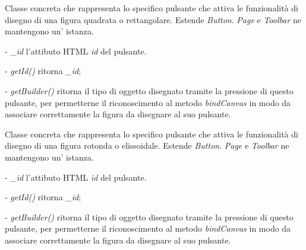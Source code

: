 Classe concreta che rappresenta lo specifico pulsante che attiva le funzionalit\` a di disegno di una figura quadrata o rettangolare.
Estende \textit{Button}.
\textit{Page} e \textit{Toolbar} ne mantengono un' istanza.
\begin{elencopuntato}[\subsubsecindent]
\item[-] \textit{{\_}id} l'attibuto HTML \textit{id} del pulsante.
\end{elencopuntato}
\begin{elencopuntato}[\subsubsecindent]
\item[-] \textit{getId()} ritorna \textit{{\_}id};
\item[-] \textit{getBuilder()} ritorna il tipo di oggetto disegnato tramite la pressione di questo pulsante, per permetterne il riconoscimento al metodo \textit{bindCanvas} in modo da associare correttamente la figura da disegnare al suo pulsante.
\end{elencopuntato}

Classe concreta che rappresenta lo specifico pulsante che attiva le funzionalit\` a di disegno di una figura rotonda o elissoidale.
Estende \textit{Button}.
\textit{Page} e \textit{Toolbar} ne mantengono un' istanza.
\begin{elencopuntato}[\subsubsecindent]
\item[-] \textit{{\_}id} l'attibuto HTML \textit{id} del pulsante.
\end{elencopuntato}
\begin{elencopuntato}[\subsubsecindent]
\item[-] \textit{getId()} ritorna \textit{{\_}id};
\item[-] \textit{getBuilder()} ritorna il tipo di oggetto disegnato tramite la pressione di questo pulsante, per permetterne il riconoscimento al metodo \textit{bindCanvas} in modo da associare correttamente la figura da disegnare al suo pulsante.
\end{elencopuntato}

